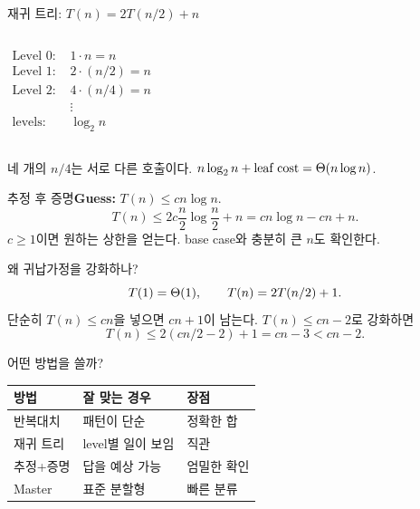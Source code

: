 \begin{frame}{재귀 트리: $T(n)=2T(n/2)+n$}
\begin{columns}[c,onlytextwidth]
\centering
{}
\begin{align*}
\text{Level 0: }&1\cdot n=n\\
\text{Level 1: }&2\cdot(n/2)=n\\
\text{Level 2: }&4\cdot(n/4)=n\\
&\vdots\\[-1mm]
\text{levels: }&\log_2 n
\end{align*}
\end{columns}
\vfill
\begin{takeaway}
네 개의 $n/4$는 서로 다른 호출이다.
$n\log_2n+\text{leaf cost}=\Theta(n\log n)$.
\end{takeaway}
\end{frame}
\begin{frame}{추정 후 증명}\textbf{Guess:} $T(n)\le cn\log n$.\[T(n)\le2c\frac n2\log\frac n2+n=cn\log n-cn+n.\]$c\ge1$이면 원하는 상한을 얻는다. base case와 충분히 큰 $n$도 확인한다.
\end{frame}
\begin{frame}{왜 귀납가정을 강화하나?}
\optional[Advanced]\hfill
\[T(1)=\Theta(1),\qquad T(n)=2T(n/2)+1.\]
단순히 $T(n)\le cn$을 넣으면 $cn+1$이 남는다. $T(n)\le cn-2$로 강화하면
\[T(n)\le2(cn/2-2)+1=cn-3<cn-2.\]
\end{frame}
\begin{frame}{어떤 방법을 쓸까?}\begin{tabular}{@{}lll@{}}\toprule 방법&잘 맞는 경우&장점\\\midrule 반복대치&패턴이 단순&정확한 합\\재귀 트리&level별 일이 보임&직관\\추정+증명&답을 예상 가능&엄밀한 확인\\Master&표준 분할형&빠른 분류\\\bottomrule\end{tabular}
\end{frame}
